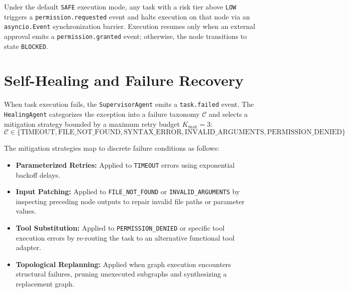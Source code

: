 \documentclass[conference]{IEEEtran}
\begin{document}
Under the default \texttt{SAFE} execution mode, any task with a risk tier above \texttt{LOW} triggers a \texttt{permission.requested} event and halts execution on that node via an \texttt{asyncio.Event} synchronization barrier. Execution resumes only when an external approval emits a \texttt{permission.granted} event; otherwise, the node transitions to state \texttt{BLOCKED}.

\section{Self-Healing and Failure Recovery}
\label{sec:healing}
When task execution fails, the \texttt{SupervisorAgent} emits a \texttt{task.failed} event. The \texttt{HealingAgent} categorizes the exception into a failure taxonomy $\mathcal{C}$ and selects a mitigation strategy bounded by a maximum retry budget $K_{\text{max}} = 3$:
\begin{equation}
\mathcal{C} \in \{\text{TIMEOUT}, \text{FILE\_NOT\_FOUND}, \text{SYNTAX\_ERROR}, \text{INVALID\_ARGUMENTS}, \text{PERMISSION\_DENIED}\}
\end{equation}

The mitigation strategies map to discrete failure conditions as follows:
\begin{itemize}
    \item \textbf{Parameterized Retries:} Applied to \texttt{TIMEOUT} errors using exponential backoff delays.
    \item \textbf{Input Patching:} Applied to \texttt{FILE\_NOT\_FOUND} or \texttt{INVALID\_ARGUMENTS} by inspecting preceding node outputs to repair invalid file paths or parameter values.
    \item \textbf{Tool Substitution:} Applied to \texttt{PERMISSION\_DENIED} or specific tool execution errors by re-routing the task to an alternative functional tool adapter.
    \item \textbf{Topological Replanning:} Applied when graph execution encounters structural failures, pruning unexecuted subgraphs and synthesizing a replacement graph.
\end{itemize}
\end{document}
